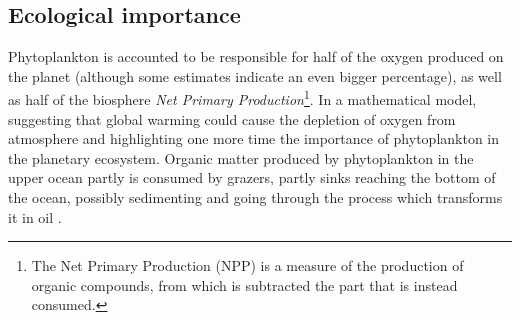 \subsection{Ecological importance}
Phytoplankton is accounted to be responsible for half of the oxygen produced on the planet (although some estimates indicate an even bigger percentage), as well as half of the biosphere \textit{Net Primary Production}\footnote{The Net Primary Production (NPP) is a measure of the production of organic compounds, from which is subtracted the part that is instead consumed.}\autocite{Behrenfeld2006Climate-drivenProductivity}. In \autocite{Sekerci2015MathematicalChange} a mathematical model, suggesting that global warming could cause the depletion of oxygen from atmosphere and highlighting one more time the importance of phytoplankton in the planetary ecosystem. Organic matter produced by phytoplankton in the upper ocean partly is consumed by grazers, partly sinks reaching the bottom of the ocean, possibly sedimenting and going through the process which transforms it in oil \autocite{Falkowski2012OceanPlankton}. 
